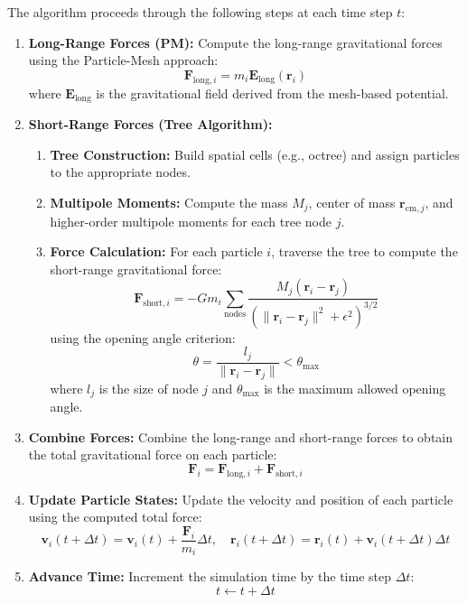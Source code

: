 The algorithm proceeds through the following steps at each time step $t$:

\begin{enumerate}
    \item \textbf{Long-Range Forces (PM):}
    Compute the long-range gravitational forces using the Particle-Mesh approach:
    \[
    \mathbf{F}_{\text{long},i} = m_i \mathbf{E}_{\text{long}}(\mathbf{r}_i)
    \]
    where $\mathbf{E}_{\text{long}}$ is the gravitational field derived from the mesh-based potential.
    
    \item \textbf{Short-Range Forces (Tree Algorithm):}
    \begin{enumerate}[label=(\alph*)]
        \item \textbf{Tree Construction:}
        Build spatial cells (e.g., octree) and assign particles to the appropriate nodes.
        
        \item \textbf{Multipole Moments:}
        Compute the mass $M_j$, center of mass $\mathbf{r}_{\text{cm},j}$, and higher-order multipole moments for each tree node $j$.
        
        \item \textbf{Force Calculation:}
        For each particle $i$, traverse the tree to compute the short-range gravitational force:
        \[
        \mathbf{F}_{\text{short},i} = -G m_i \sum_{\text{nodes}} \frac{M_j (\mathbf{r}_i - \mathbf{r}_j)}{(\|\mathbf{r}_i - \mathbf{r}_j\|^2 + \epsilon^2)^{3/2}}
        \]
        using the opening angle criterion:
        \[
        \theta = \frac{l_j}{\|\mathbf{r}_i - \mathbf{r}_j\|} < \theta_{\text{max}}
        \]
        where $l_j$ is the size of node $j$ and $\theta_{\text{max}}$ is the maximum allowed opening angle.
    \end{enumerate}
    
    \item \textbf{Combine Forces:} 
    Combine the long-range and short-range forces to obtain the total gravitational force on each particle:
    \[
    \mathbf{F}_i = \mathbf{F}_{\text{long},i} + \mathbf{F}_{\text{short},i}
    \]
    
    \item \textbf{Update Particle States:}
    Update the velocity and position of each particle using the computed total force:
    \[
    \mathbf{v}_i(t + \Delta t) = \mathbf{v}_i(t) + \frac{\mathbf{F}_i}{m_i} \Delta t, \quad \mathbf{r}_i(t + \Delta t) = \mathbf{r}_i(t) + \mathbf{v}_i(t + \Delta t) \Delta t
    \]
    
    \item \textbf{Advance Time:} 
    Increment the simulation time by the time step $\Delta t$:
    \[
    t \leftarrow t + \Delta t
    \]
\end{enumerate}

